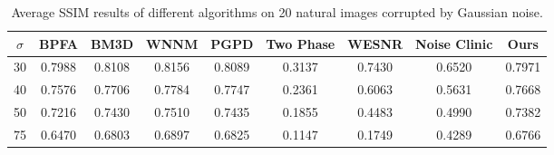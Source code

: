 \documentclass[runningheads]{llncs}
\begin{document}
\vspace{-0.3in}

\begin{table}
\caption{Average SSIM results of different algorithms on 20 natural images corrupted by Gaussian noise.}
\vspace{-0.1in}
\label{tab2}
\begin{center}
\renewcommand\arraystretch{1}
\small
\begin{tabular}{|c||c|c|c|c|c|c|c|c|}
\hline
$\sigma$ & \textbf{BPFA} &\textbf{BM3D}&\textbf{WNNM} & \textbf{PGPD} & \textbf{Two Phase} & \textbf{WESNR} &\textbf{Noise Clinic} & \textbf{Ours}
\\
\hline
30 & 0.7988 & 0.8108 & 0.8156 &0.8089 & 0.3137 & 0.7430 & 0.6520 & 0.7971 
\\
\hline
40 & 0.7576 & 0.7706 & 0.7784 & 0.7747 & 0.2361 & 0.6063 & 0.5631 & 0.7668 
\\
\hline
50 & 0.7216 & 0.7430 & 0.7510 & 0.7435 & 0.1855 & 0.4483 & 0.4990 & 0.7382
\\
\hline
75 & 0.6470 & 0.6803 & 0.6897 & 0.6825 & 0.1147 & 0.1749 & 0.4289 & 0.6766
\\
\hline
\end{tabular}
\end{center}
\end{table}
\end{document}

